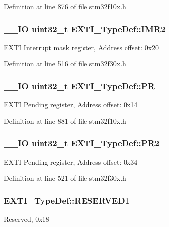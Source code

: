 Definition at line 876 of file stm32f10x.\-h.

\hypertarget{struct_e_x_t_i___type_def_a0d6bf1df9ad8ca71ac21d19a1a9c9375}{
\subsubsection[{I\-M\-R2}]{\setlength{\rightskip}{0pt plus 5cm}\-\_\-\-\_\-\-I\-O {\bf uint32\-\_\-t} E\-X\-T\-I\-\_\-\-Type\-Def\-::\-I\-M\-R2}}\label{struct_e_x_t_i___type_def_a0d6bf1df9ad8ca71ac21d19a1a9c9375}
E\-X\-T\-I Interrupt mask register, Address offset\-: 0x20 

Definition at line 516 of file stm32f30x.\-h.

\hypertarget{struct_e_x_t_i___type_def_a133294b87dbe6a01e8d9584338abc39a}{
\subsubsection[{P\-R}]{\setlength{\rightskip}{0pt plus 5cm}\-\_\-\-\_\-\-I\-O {\bf uint32\-\_\-t} E\-X\-T\-I\-\_\-\-Type\-Def\-::\-P\-R}}\label{struct_e_x_t_i___type_def_a133294b87dbe6a01e8d9584338abc39a}
E\-X\-T\-I Pending register, Address offset\-: 0x14 

Definition at line 881 of file stm32f10x.\-h.

\hypertarget{struct_e_x_t_i___type_def_a70a4f12449826cb6aeceed7ee6253752}{
\subsubsection[{P\-R2}]{\setlength{\rightskip}{0pt plus 5cm}\-\_\-\-\_\-\-I\-O {\bf uint32\-\_\-t} E\-X\-T\-I\-\_\-\-Type\-Def\-::\-P\-R2}}\label{struct_e_x_t_i___type_def_a70a4f12449826cb6aeceed7ee6253752}
E\-X\-T\-I Pending register, Address offset\-: 0x34 

Definition at line 521 of file stm32f30x.\-h.

\hypertarget{struct_e_x_t_i___type_def_a022f7a6ab98b1cf66443e0af882122ef}{
\subsubsection[{R\-E\-S\-E\-R\-V\-E\-D1}]{ E\-X\-T\-I\-\_\-\-Type\-Def\-::\-R\-E\-S\-E\-R\-V\-E\-D1}}\label{struct_e_x_t_i___type_def_a022f7a6ab98b1cf66443e0af882122ef}
Reserved, 0x18 

